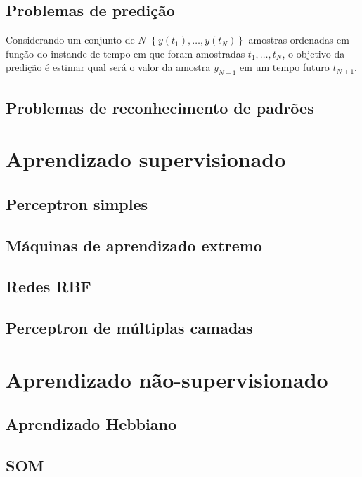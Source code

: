 \documentclass[conference]{IEEEtran}
\begin{document}
	\subsection{Problemas de predição}
	Considerando um conjunto de $N$ $\left\lbrace y(t_1),\dots, y(t_N) \right\rbrace $ amostras ordenadas em função do instande de tempo em que foram amostradas $t_1, \dots, t_N$, o objetivo da predição é estimar qual será o valor da amostra $y_{N+1}$ em um tempo futuro $t_{N+1}$.

	\subsection{Problemas de reconhecimento de padrões}
	
	\section{Aprendizado supervisionado}
	\subsection{Perceptron simples}
	\subsection{Máquinas de aprendizado extremo}
	\subsection{Redes RBF}
	\subsection{Perceptron de múltiplas camadas}
	\section{Aprendizado não-supervisionado}
	\subsection{Aprendizado Hebbiano}
	\subsection{SOM}

\end{document}
